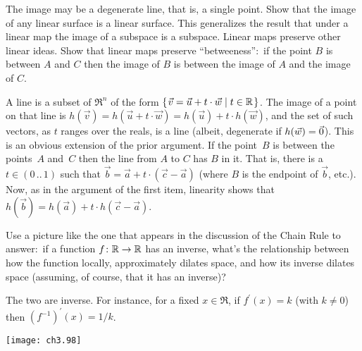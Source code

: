 \begin{exercises}
\begin{exparts}
         The image may be a degenerate line, that is, a single point.
      \partsitem Show that the image of any linear surface is a linear surface.
         This generalizes the result that under a linear map the image of
         a subspace is a subspace.
      \partsitem Linear maps preserve other linear ideas.
         Show that linear maps preserve ``betweeness'':~if the point
         $B$ is between $A$ and $C$ then the image of $B$ is between the
         image of $A$ and the image of $C$.
    \end{exparts}
    \begin{answer}
      \begin{exparts}
        \partsitem A line is a subset of $\Re^n$ of the form
          $\mbox{$\{\hspace{0.1em}\vec{v}=\vec{u}+t\cdot\vec{w}\mid t\in\mathbb{R}\hspace{0.1em}\}$}$.
          The image of a point on that line is 
          $h(\vec{v})=h(\vec{u}+t\cdot\vec{w})=h(\vec{u})+t\cdot h(\vec{w})$,
          and the set of such vectors, as $t$ ranges over the reals, is
          a line (albeit, degenerate if $h(\vec{w})=\vec{0}$).
        \partsitem This is an obvious extension of the prior argument.
        \partsitem If the point~$B$ is between the points~$A$ and~$C$ then the
          line from $A$ to $C$ has $B$ in it.
          That is, there is a $t\in (0\,..\,1)$ such that
          $\vec{b}=\vec{a}+t\cdot (\vec{c}-\vec{a})$ (where $B$ is the
          endpoint of $\vec{b}$, etc.).
          Now, as in the argument of the first item, linearity shows that
          $h(\vec{b})=h(\vec{a})+t\cdot h(\vec{c}-\vec{a})$.  
      \end{exparts}
    \end{answer}
  \item 
    Use a picture like the one 
    that appears in the discussion of the Chain Rule
    to answer:~if a function $\mbox{$f\colon \mathbb{R}\to \mathbb{R}$}$ has an inverse,
    what's the relationship between how the function \Dash locally, 
    approximately \Dash  dilates space, and
    how its inverse dilates space (assuming, of course, that it has an 
    inverse)?
    \begin{answer}
      The two are inverse.
      For instance, for a fixed $x\in\Re$,
      if $f^\prime (x)=k$ (with $k\neq 0$) then 
      $(f^{-1})^\prime (x)=1/k$.
      \begin{center}
        \texttt{[image: ch3.98]}
     \end{center}
    \end{answer}
\end{exercises}
\endinput


